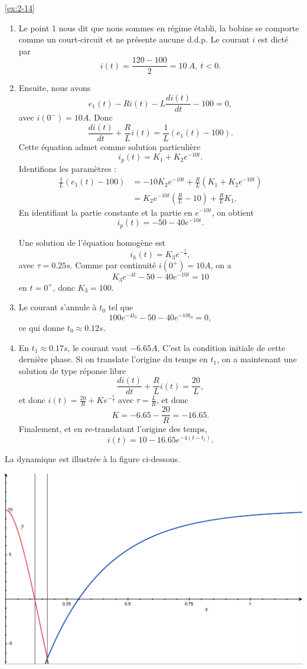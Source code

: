 \begin{solexercise}{\ref{ex:2-14}}
	\label{solex:2-14}
\begin{enumerate}
	\item Le point 1 nous dit que nous sommes en r\'egime \'etabli, la bobine se comporte comme un court-circuit et ne pr\'esente aucune d.d.p. Le courant $i$ est dict\'e par 
	$$i(t) = \frac{120-100}{2} = 10 \ A, \ t < 0.$$
	\item Ensuite, nous avons 
	$$e_1(t) - R i(t) - L \frac{di(t)}{dt} - 100 = 0,$$
	avec $i(0^-) = 10 A$.
	Donc 
	$$\frac{di(t)}{dt} + \frac{R}{L} i(t)  = \frac{1}{L} (e_1(t)-100).$$
	Cette \'equation admet comme solution particuli\`ere $$i_p(t) = K_1 + K_2 e^{-10t}.$$
	Identifions les param\`etres :
	\begin{align*}
	\frac{1}{L} (e_1(t)-100) &= -10 K_2 e^{-10t} + \frac{R}{L} (K_1 + K_2 e^{-10t}) \\
	&= K_2 e^{-10t} (\frac{R}{L} -10 ) + \frac{R}{L} K_1.
	\end{align*}
	En identifiant la partie constante et la partie en $e^{-10t}$, on obtient 
	$$i_p(t) = -50-40 e^{-10t}.$$
	
	Une solution de l'\'equation homog\`ene est $$i_h(t) = K_3 e^{-\frac{t}{\tau}},$$  avec $\tau = 0.25 s$. Comme par continuit\'e $i(0^+) = 10 A$, on a
	$$K_3 e^{-4t} -50-40 e^{-10t} = 10$$
	en $t = 0^+$, donc $K_3 = 100$.
	\item 
	Le courant s'annule \`a $t_0$ tel que $$100 e^{-4t_0} -50-40 e^{-10t_0} = 0,$$
	ce qui donne $t_0 \approx 0.12 s$. 
	\item En $t_1 \approx 0.17s$, le courant vaut $-6.65 A$. C'est la condition initiale de cette derni\`ere phase. Si on translate l'origine du temps en $t_1$, on a maintenant une solution de type r\'eponse libre
	$$\frac{di(t)}{dt} + \frac{R}{L} i(t)  = \frac{20}{L},$$
	et donc $i(t) = \frac{20}{R} + K e^{-\frac{t}{\tau}}$ avec $\tau = \frac{L}{R}$, et donc $$K = -6.65 - \frac{20}{R} = -16.65.$$
	Finalement, et en re-translatant l'origine des temps,  $$i(t) = 10 - 16.65 e^{-4(t-t_1)}.$$
\end{enumerate}
La dynamique est illustr\'ee \`a la figure ci-dessous.
\begin{center}
\includegraphics[width=0.7\linewidth]{figs/ex_RLC}
\end{center}

\end{solexercise}